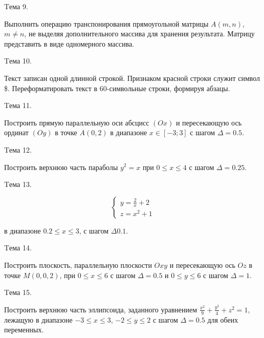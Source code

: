 \documentclass[12pt, a4paper]{article}
\begin{document}
\begin{flushleft}
		{Tема 9. \par Выполнить операцию транспонирования прямоугольной матрицы
		$A(m,n)$, $m\neq n$, не выделяя дополнительного массива для хранения
		результата. Матрицу представить в виде одномерного массива.} \par
		{Tема 10. \par Текст записан одной длинной строкой. Признаком красной строки
		служит символ \$. Переформатировать текст в 60-символьные строки,
		формируя абзацы.} \par
		{Tема 11. \par Построить прямую параллельную оси абсцисс $(Ox)$ и пересекающую
		ось ординат $(Oy)$ в точке $A(0,2)$ в диапазоне $x\in [-3;3]$ с шагом $\Delta =0.5$.} \par
		{Tема 12. \par Построить верхнюю часть параболы $y^2=x$ при $0\leq x \leq 4$ с шагом $\Delta =0.25$.} \par
		{Tема 13. \par 
		\begin{equation*} 
			\begin{cases} 
				y=\frac{2}{x}+2
				\\
				z=x^2+1
			\end{cases} 
		\end{equation*}
		\begin{center}в диапазоне $0.2\leq x\leq 3$, с шагом $\Delta 0.1$.\end{center}} \par
		{Tема 14. \par Построить плоскость, параллельную плоскости $Oxy$ и пересекающую ось $Oz$
		в точке $M(0,0,2)$, при $0\leq x\leq 6$ с шагом $\Delta =0.5$ и $0\leq y\leq 6$
		с шагом $\Delta =1$.} \par
		{Tема 15. \par Построить верхнюю часть эллипсоида, заданного уравнением 
		$\frac{x^2}{9}+\frac{y^2}{4}+z^2=1$, лежащую в диапазоне $-3\leq x\leq 3$, $-2\leq y\leq 2$ с 
		шагом $\Delta =0.5$ для обеих переменных.} \par
	\end{flushleft}
\end{document}
